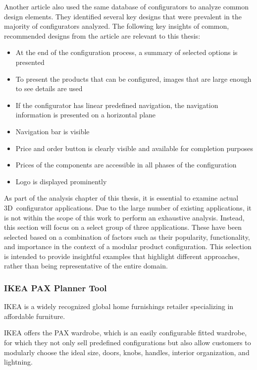 Another article also used the same database of configurators to analyze common design elements. They identified several key designs that were prevalent in the majority of configurators analyzed. The following key insights of common, recommended designs from the article are relevant to this thesis: \cite{Leitner2014}
\begin{itemize}
    \item At the end of the configuration process, a summary of selected options is presented
    \item To present the products that can be configured, images that are large enough to see details are used
    \item If the configurator has linear predefined navigation, the navigation information is presented on a horizontal plane
    \item Navigation bar is visible
    \item Price and order button is clearly visible and available for completion purposes
    \item Prices of the components are accessible in all phases of the configuration
    \item Logo is displayed prominently
\end{itemize}

As part of the analysis chapter of this thesis, it is essential to examine actual 3D~configurator applications. Due to the large number of existing applications, it is not within the scope of this work to perform an exhaustive analysis. Instead, this section will focus on a select group of three applications. These have been selected based on a combination of factors such as their popularity, functionality, and importance in the context of a modular product configuration. This selection is intended to provide insightful examples that highlight different approaches, rather than being representative of the entire domain.


\subsubsection{IKEA PAX Planner Tool}

IKEA is a widely recognized global home furnishings retailer specializing in affordable furniture. \cite{StatistaIkea}

IKEA offers the PAX wardrobe, which is an easily configurable fitted wardrobe, for which they not only sell predefined configurations but also allow customers to modularly choose the ideal size, doors, knobs, handles, interior organization, and lightning.

